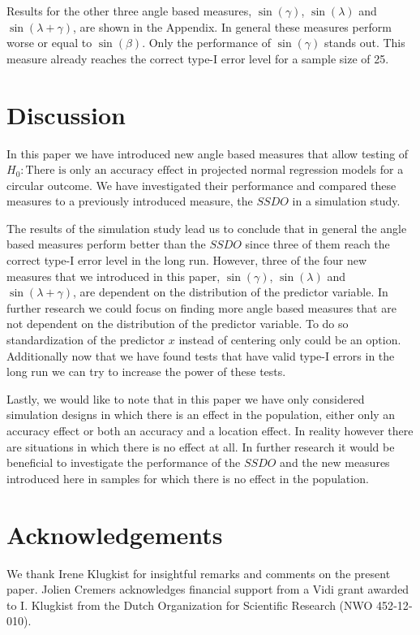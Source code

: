 \documentclass[]{interact}
\begin{document}
Results for the other three angle based measures, $\sin(\gamma)$,
$\sin(\lambda)$ and $\sin(\lambda + \gamma)$, are shown in the Appendix. In
general these measures perform worse or equal to $\sin(\beta)$. Only the
performance of $\sin(\gamma)$ stands out. This measure already reaches the
correct type-I error level for a sample size of 25. 





\section{Discussion}

In this paper we have introduced new angle based measures that allow testing of
\textit{$H_0: \text{There is only an accuracy effect}$} in projected normal regression
models for a circular outcome. We have investigated their performance and
compared these measures to a previously introduced measure, the $SSDO$ in a
simulation study.

The results of the simulation study lead us to conclude that in general the
angle based measures perform better than the $SSDO$ since three of them reach
the correct type-I error level in the long run. However, three of the four new
measures that we introduced in this paper, $\sin(\gamma)$, $\sin(\lambda)$ and
$\sin(\lambda + \gamma)$, are dependent on the distribution of the predictor
variable. In further research we could focus on finding more angle based
measures that are not dependent on the distribution of the predictor variable.
To do so standardization of the predictor $x$ instead of centering only could be
an option. Additionally now that we have found tests that have valid type-I
errors in the long run we can try to increase the power of these tests.

Lastly, we would like to note that in this paper we have only considered
simulation designs in which there is an effect in the population, either only an
accuracy effect or both an accuracy and a location effect. In reality however
there are situations in which there is no effect at all. In further research it
would be beneficial to investigate the performance of the $SSDO$ and the new
measures introduced here in samples for which there is no effect in the
population.

\section*{Acknowledgements}
We thank Irene Klugkist for insightful remarks and comments on the present
paper. Jolien Cremers acknowledges financial support from a Vidi grant awarded
to I. Klugkist from the Dutch Organization for Scientific Research (NWO
452‐12‐010).
\end{document}
